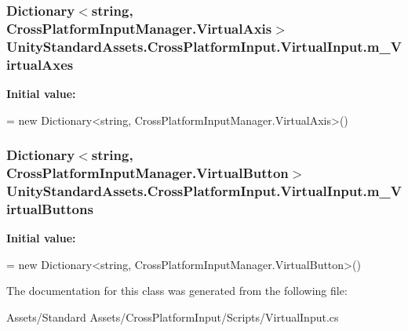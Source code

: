 \subsubsection[{\texorpdfstring{m\+\_\+\+Virtual\+Axes}{m_VirtualAxes}}]{\setlength{\rightskip}{0pt plus 5cm}Dictionary$<$string, {\bf Cross\+Platform\+Input\+Manager.\+Virtual\+Axis}$>$ Unity\+Standard\+Assets.\+Cross\+Platform\+Input.\+Virtual\+Input.\+m\+\_\+\+Virtual\+Axes\hspace{0.3cm}{\ttfamily [protected]}}\hypertarget{class_unity_standard_assets_1_1_cross_platform_input_1_1_virtual_input_abb0e84e118d732a626c67adb78b26eff}{}\label{class_unity_standard_assets_1_1_cross_platform_input_1_1_virtual_input_abb0e84e118d732a626c67adb78b26eff}
{\bfseries Initial value\+:}
\begin{DoxyCode}
=
            \textcolor{keyword}{new} Dictionary<string, CrossPlatformInputManager.VirtualAxis>()
\end{DoxyCode}
\subsubsection[{\texorpdfstring{m\+\_\+\+Virtual\+Buttons}{m_VirtualButtons}}]{\setlength{\rightskip}{0pt plus 5cm}Dictionary$<$string, {\bf Cross\+Platform\+Input\+Manager.\+Virtual\+Button}$>$ Unity\+Standard\+Assets.\+Cross\+Platform\+Input.\+Virtual\+Input.\+m\+\_\+\+Virtual\+Buttons\hspace{0.3cm}{\ttfamily [protected]}}\hypertarget{class_unity_standard_assets_1_1_cross_platform_input_1_1_virtual_input_adbc824b5db08f6929aee3be874bc76cb}{}\label{class_unity_standard_assets_1_1_cross_platform_input_1_1_virtual_input_adbc824b5db08f6929aee3be874bc76cb}
{\bfseries Initial value\+:}
\begin{DoxyCode}
=
            \textcolor{keyword}{new} Dictionary<string, CrossPlatformInputManager.VirtualButton>()
\end{DoxyCode}


The documentation for this class was generated from the following file\+:\begin{DoxyCompactItemize}
\item 
Assets/\+Standard Assets/\+Cross\+Platform\+Input/\+Scripts/Virtual\+Input.\+cs\end{DoxyCompactItemize}

